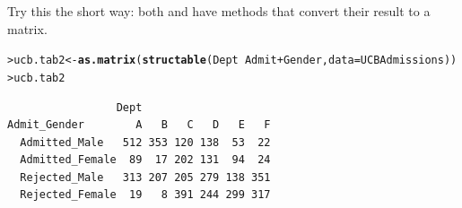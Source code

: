 \documentclass[11pt]{report}\usepackage[]{graphicx}\usepackage[]{color}
\makeatletter
\newcommand{\hlopt}[1]{\textcolor[rgb]{0,0,0}{#1}}%
\newcommand{\hlstd}[1]{\textcolor[rgb]{0.345,0.345,0.345}{#1}}%
\newcommand{\hlkwb}[1]{\textcolor[rgb]{0.69,0.353,0.396}{#1}}%
\newcommand{\hlkwc}[1]{\textcolor[rgb]{0.333,0.667,0.333}{#1}}%
\newcommand{\hlkwd}[1]{\textcolor[rgb]{0.737,0.353,0.396}{\textbf{#1}}}%
\newenvironment{kframe}{%
 \def\at@end@of@kframe{}%
 \ifinner\ifhmode%
  \def\at@end@of@kframe{\end{minipage}}%
  \begin{minipage}{\columnwidth}%
 \fi\fi%
 \def\FrameCommand##1{\hskip\@totalleftmargin \hskip-\fboxsep
 \colorbox{shadecolor}{##1}\hskip-\fboxsep
     \hskip-\linewidth \hskip-\@totalleftmargin \hskip\columnwidth}%
 \MakeFramed {\advance\hsize-\width
   \@totalleftmargin\z@ \linewidth\hsize
   \@setminipage}}%
 {\par\unskip\endMakeFramed%
 \at@end@of@kframe}
\newenvironment{knitrout}{}{} %
\renewenvironment{knitrout}{\small\renewcommand{\baselinestretch}{.85}}{} %
\makeatother
\begin{document}
\begin{Exercises}
\begin{enumerate*}
    \item Try this the short way:  both  and  have 
    methods that convert their result to a matrix.
    \begin{ans}
\begin{knitrout}
\color{fgcolor}\begin{kframe}
\begin{alltt}
\hlstd{> }\hlstd{ucb.tab2} \hlkwb{<-} \hlkwd{as.matrix}\hlstd{(}\hlkwd{structable}\hlstd{(Dept} \hlopt{~} \hlstd{Admit} \hlopt{+} \hlstd{Gender,} \hlkwc{data} \hlstd{= UCBAdmissions))}
\hlstd{> }\hlstd{ucb.tab2}
\end{alltt}
\begin{verbatim}
                 Dept
Admit_Gender        A   B   C   D   E   F
  Admitted_Male   512 353 120 138  53  22
  Admitted_Female  89  17 202 131  94  24
  Rejected_Male   313 207 205 279 138 351
  Rejected_Female  19   8 391 244 299 317
\end{verbatim}
\end{kframe}
\end{knitrout}
    \end{ans}
    
  \end{enumerate*}


\end{Exercises}
\end{document}
